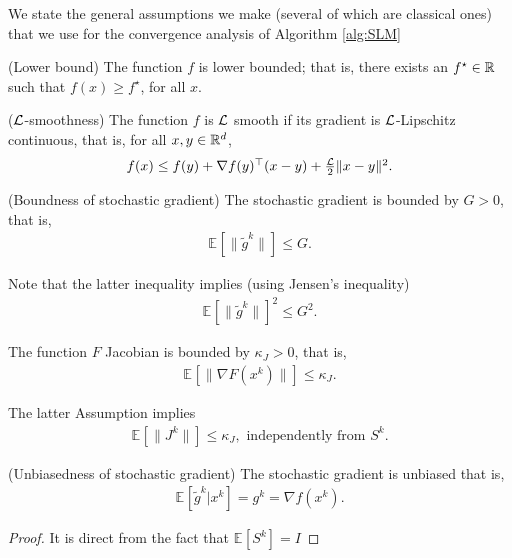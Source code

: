\documentclass{article}
\begin{document}
We state the general assumptions we make (several of which are classical ones) that we use for the convergence analysis of Algorithm \ref{alg:SLM}
\begin{assumption}(Lower bound) \label{assum:lower_bound}
The function $f$ is lower bounded; that is, there exists an $f^\star \in\mathbb{R}$ such that $f(x)\ge f^\star$, for all $x$. 
\end{assumption}
\begin{assumption}(${\cal L} $-smoothness) \label{assm:smoothness}
The function $f$ is ${\cal L} $ smooth if its gradient is ${\cal L} $-Lipschitz continuous, that is, for all $x,y\in\mathbb{R}^d$, $$\textstyle{ f(x) \le f(y) + \nabla f(y)^\top (x-y)  + \frac{{\cal L}}{2} \|x-y\|^2}.$$  
\end{assumption}
\begin{assumption}(Boundness of stochastic gradient)\label{assum:Unbiased_grad}
The stochastic gradient is bounded by $G>0$, that is,
 \begin{eqnarray*}
\textstyle\mathbb{E}_{}\left[\|\tilde{g}^k\|\right] \le G.
\end{eqnarray*} 
\end{assumption} 
Note that  the latter inequality implies (using Jensen's inequality)
\begin{eqnarray*}
\textstyle\mathbb{E}_{}\left[\|\tilde{g}^k\|\right]^2 \le G^2.
\end{eqnarray*} 
\begin{assumption}\label{assum:bounded_jac}
 The function $F$ Jacobian is bounded by $\kappa_J>0$, that is,
  \begin{eqnarray*}
\textstyle\mathbb{E}_{}\left[\|\nabla F(x^k)\|\right] \le \kappa_J.
\end{eqnarray*} 

\end{assumption}
The latter Assumption implies 
 \begin{eqnarray*}
\textstyle\mathbb{E}_{}\left[\|J^k\|\right] \le \kappa_J, \text{ independently from } S^k.
\end{eqnarray*} 
\begin{lemma}(Unbiasedness of stochastic gradient)\label{lem:Unbiased_grad}
The stochastic gradient is unbiased that is,
 \begin{eqnarray*}
\textstyle\mathbb{E}_{}\left[\tilde{g}^k| x^k \right] = g^k = \nabla f(x^k).
\end{eqnarray*} 
\end{lemma} 
\begin{proof}
It is direct from the fact that $\mathbb{E}_{}\left[S^k \right] = I$
\end{proof}
\end{document}
